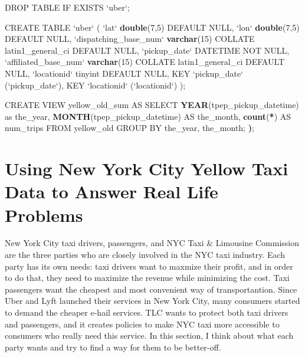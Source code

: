 \documentclass[12pt,twoside]{reedthesis}
\newenvironment{Shaded}{\begin{snugshade}}{\end{snugshade}}
\newcommand{\KeywordTok}[1]{\textcolor[rgb]{0.13,0.29,0.53}{\textbf{#1}}}
\newcommand{\DataTypeTok}[1]{\textcolor[rgb]{0.13,0.29,0.53}{#1}}
\newcommand{\DecValTok}[1]{\textcolor[rgb]{0.00,0.00,0.81}{#1}}
\newcommand{\StringTok}[1]{\textcolor[rgb]{0.31,0.60,0.02}{#1}}
\newcommand{\OtherTok}[1]{\textcolor[rgb]{0.56,0.35,0.01}{#1}}
\newcommand{\OperatorTok}[1]{\textcolor[rgb]{0.81,0.36,0.00}{\textbf{#1}}}
\newcommand{\ErrorTok}[1]{\textcolor[rgb]{0.64,0.00,0.00}{\textbf{#1}}}
\newcommand{\NormalTok}[1]{#1}
\theoremstyle{definition}
\theoremstyle{definition}
\theoremstyle{definition}
\theoremstyle{remark}
\begin{document}
\begin{Shaded}
\begin{Highlighting}[]
\NormalTok{DROP TABLE IF EXISTS }\StringTok{`}\DataTypeTok{uber}\StringTok{`}\NormalTok{;}

\NormalTok{CREATE TABLE }\StringTok{`}\DataTypeTok{uber}\StringTok{`}\NormalTok{ (}
 \StringTok{`}\DataTypeTok{lat}\StringTok{`} \KeywordTok{double}\NormalTok{(}\DecValTok{7}\NormalTok{,}\DecValTok{5}\NormalTok{) DEFAULT }\OtherTok{NULL}\NormalTok{,}
 \StringTok{`}\DataTypeTok{lon}\StringTok{`} \KeywordTok{double}\NormalTok{(}\DecValTok{7}\NormalTok{,}\DecValTok{5}\NormalTok{) DEFAULT }\OtherTok{NULL}\NormalTok{,}
 \StringTok{`}\DataTypeTok{dispatching_base_num}\StringTok{`} \KeywordTok{varchar}\NormalTok{(}\DecValTok{15}\NormalTok{) COLLATE latin1_general_ci DEFAULT }\OtherTok{NULL}\NormalTok{,}
 \StringTok{`}\DataTypeTok{pickup_date}\StringTok{`}\NormalTok{ DATETIME NOT }\OtherTok{NULL}\NormalTok{,}
 \StringTok{`}\DataTypeTok{affiliated_base_num}\StringTok{`} \KeywordTok{varchar}\NormalTok{(}\DecValTok{15}\NormalTok{) COLLATE latin1_general_ci DEFAULT }\OtherTok{NULL}\NormalTok{,}
 \StringTok{`}\DataTypeTok{locationid}\StringTok{`}\NormalTok{ tinyint DEFAULT }\OtherTok{NULL}\NormalTok{,}
\NormalTok{ KEY }\StringTok{`}\DataTypeTok{pickup_date}\StringTok{`}\NormalTok{ (}\StringTok{`}\DataTypeTok{pickup_date}\StringTok{`}\NormalTok{),}
\NormalTok{ KEY }\StringTok{`}\DataTypeTok{locationid}\StringTok{`}\NormalTok{ (}\StringTok{`}\DataTypeTok{locationid}\StringTok{`}\NormalTok{)}
\NormalTok{);}

\NormalTok{CREATE VIEW yellow_old_sum AS SELECT }\KeywordTok{YEAR}\NormalTok{(tpep_pickup_datetime) as the_year, }\KeywordTok{MONTH}\NormalTok{(tpep_pickup_datetime) AS the_month, }\KeywordTok{count}\NormalTok{(}\OperatorTok{*}\NormalTok{) AS num_trips}
\NormalTok{  FROM yellow_old}
\NormalTok{  GROUP BY the_year, the_month; }
\ErrorTok{)}\NormalTok{; }
\end{Highlighting}
\end{Shaded}
\chapter{Using New York City Yellow Taxi Data to Answer Real Life
Problems}\label{chapter2}

New York City taxi drivers, passengers, and NYC Taxi \& Limousine
Commission are the three parties who are closely involved in the NYC
taxi industry. Each party has its own needs: taxi drivers want to
maxmize their profit, and in order to do that, they need to maximize the
revenue while minimizing the cost. Taxi passengers want the cheapest and
most convenient way of transportantion. Since Uber and Lyft launched
their services in New York City, many consumers started to demand the
cheaper e-hail services. TLC wants to protect both taxi drivers and
passengers, and it creates policies to make NYC taxi more accessible to
consumers who really need this service. In this section, I think about
what each party wants and try to find a way for them to be better-off.
\end{document}
